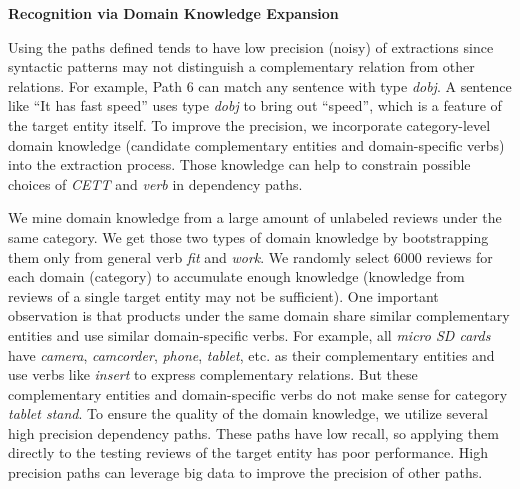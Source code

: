 \textbf{Recognition via Domain Knowledge Expansion}
\label{sec:b}

Using the paths defined tends to have low precision (noisy) of extractions since syntactic patterns may not distinguish a complementary relation from other relations. For example, Path 6 can match any sentence with type \textit{dobj}. A sentence like ``It has fast speed'' uses type \textit{dobj} to bring out ``speed'', which is a feature of the target entity itself. To improve the precision, we incorporate category-level domain knowledge (candidate complementary entities and domain-specific verbs) into the extraction process. Those knowledge can help to constrain possible choices of \textit{CETT} and \textit{verb} in dependency paths. 

We mine domain knowledge from a large amount of unlabeled reviews under the same category. We get those two types of domain knowledge by bootstrapping them only from general verb \textit{fit} and \textit{work}. We randomly select 6000 reviews for each domain (category) to accumulate enough knowledge (knowledge from reviews of a single target entity may not be sufficient). One important observation is that products under the same domain share similar complementary entities and use similar domain-specific verbs. For example, all \textit{micro SD cards} have \textit{camera}, \textit{camcorder}, \textit{phone}, \textit{tablet}, etc. as their complementary entities and use verbs like \textit{insert} to express complementary relations. But these complementary entities and domain-specific verbs do not make sense for category \textit{tablet stand}. To ensure the quality of the domain knowledge, we utilize several high precision dependency paths. These paths have low recall, so applying them directly to the testing reviews of the target entity has poor performance. High precision paths can leverage big data to improve the precision of other paths.

\begin{table}
\centering
{}
\caption{Summary of dependency paths for extraction}
\label{chap6:table:bigdatarule}
\end{table}

